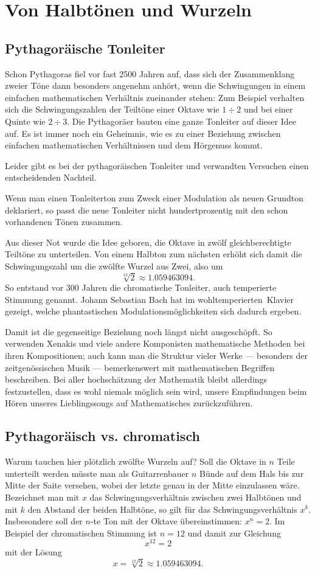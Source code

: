 \documentclass[%
11pt,%
twoside,%
titlepage,%
german,%
headsepline%
]{scrartcl}
\begin{document}
\section{Von Halbt\"onen und Wurzeln}
\subsection{Pythagor\"aische Tonleiter}
Schon Pythagoras fiel vor fast 2500 Jahren auf, dass sich der Zusammenklang zweier T\"one dann besonders angenehm anh\"ort, wenn die Schwingungen in einem einfachen mathematischen Verh\"altnis zueinander stehen: Zum Beispiel verhalten sich die Schwingungszahlen der Teilt\"one einer Oktave wie $1\div 2$ und bei einer Quinte wie $2\div 3$. Die Pythagor\"aer bauten eine ganze Tonleiter auf dieser Idee auf. Es ist immer noch ein Geheimnis, wie es zu einer Beziehung zwischen einfachen mathematischen Verh\"altnissen und dem H\"orgenuss kommt.

Leider gibt es bei der pythagor\"aischen Tonleiter und verwandten Versuchen einen entscheidenden Nachteil.
\begin{bem}
Wenn man einen Tonleiterton zum Zweck einer Modulation als neuen Grundton deklariert, so passt die neue Tonleiter nicht hundertprozentig mit den schon vorhandenen T\"onen zusammen.
\end{bem}
Aus dieser Not wurde die Idee geboren, die Oktave in zw\"olf gleichberechtigte Teilt\"one zu unterteilen. Von einem Halbton zum n\"achsten erh\"oht sich damit die Schwingungszahl um die zw\"olfte Wurzel aus Zwei, also um
$$\sqrt[12]{2}\approx1.059463094.$$
So entstand vor 300 Jahren die chromatische Tonleiter, auch temperierte Stimmung genannt. Johann Sebastian Bach hat im \glqq wohltemperierten\grqq\ Klavier gezeigt, welche phantastischen Modulationsm\"oglichkeiten sich dadurch ergeben.

Damit ist die gegenseitige Beziehung noch l\"angst nicht ausgesch\"opft. So verwenden Xenakis und viele andere Komponisten mathematische Methoden bei ihren Kompositionen; auch kann man die Struktur vieler Werke --- besonders der zeitgen\"ossischen Musik --- bemerkenswert mit mathematischen Begriffen beschreiben. Bei aller hochsch\"atzung der Mathematik bleibt allerdings festzustellen, dass es wohl niemals m\"oglich sein wird, unsere Empfindungen beim H\"oren unseres Lieblingssongs auf Mathematisches zur\"uckzuf\"uhren.

\subsection{Pythagor\"aisch vs. chromatisch}
Warum tauchen hier pl\"otzlich zw\"olfte Wurzeln auf? Soll die Oktave in $n$ Teile unterteilt werden m\"usste man als Guitarrenbauer $n$ B\"unde auf dem Hals bis zur Mitte der Saite versehen, wobei der letzte genau in der Mitte einzulassen w\"are. Bezeichnet man mit $x$ das Schwingungsverh\"altnis zwischen zwei Halbt\"onen und mit $k$ den Abstand der beiden Halbt\"one, so gilt f\"ur das Schwingungsverh\"altnis $x^k$. Insbesondere soll der $n$-te Ton mit der Oktave \"ubereinstimmen: $x^n=2$. Im Beispiel der chromatischen Stimmung ist $n=12$ und damit zur Gleichung
$$x^{12}=2$$
mit der L\"osung
$$x=\sqrt[12]{2}\approx1.059463094.$$
\end{document}
